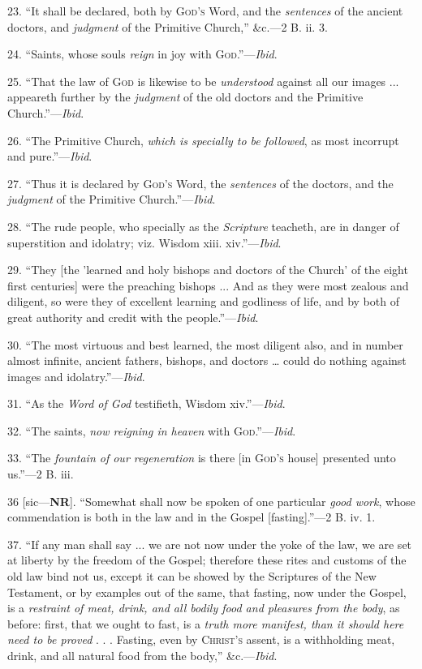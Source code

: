 23. ``It shall be declared, both by G\textsc{od's}
Word, and the \emph{sentences} of the ancient doctors, and \emph{judgment}
of the Primitive Church,'' \&c.—2 B. ii. 3.

24. ``Saints, whose souls \emph{reign} in joy with G\textsc{od}.''—\emph{Ibid}.

25. ``That the law of G\textsc{od} is likewise to
be \emph{understood} against all our images ... appeareth further by
the \emph{judgment} of the old doctors and the Primitive Church.''—\emph{Ibid}.

26. ``The Primitive Church, \emph{which is specially to be
followed}, as most incorrupt and pure.''—\emph{Ibid}.

27. ``Thus it is declared by G\textsc{od's} Word,
the \emph{sentences} of the doctors, and the \emph{judgment} of the
Primitive Church.''—\emph{Ibid}.

28. ``The rude people, who specially as the \emph{Scripture}
teacheth, are in danger of superstition and idolatry; viz. Wisdom
xiii. xiv.''—\emph{Ibid}.

29. ``They [the 'learned and holy bishops and doctors of the
Church' of the eight first centuries] were the preaching bishops ...
And as they were most zealous and diligent, so were they of excellent
learning and godliness of life, and by both of great authority and
credit with the people.''—\emph{Ibid}.

30. ``The most virtuous and best learned, the most diligent
also, and in number almost infinite, ancient fathers, bishops, and
doctors … could do nothing against images and idolatry.''—\emph{Ibid}.

31. ``As the \emph{Word of God} testifieth, Wisdom xiv.''—\emph{Ibid}.

32. ``The saints, \emph{now reigning in heaven} with G\textsc{od}.''—\emph{Ibid}.

33. ``The \emph{fountain of our regeneration} is there [in G\textsc{od's}
house] presented unto us.''—2 B. iii.

36 [sic—\textbf{NR}]. ``Somewhat
shall now be spoken of one particular \emph{good work}, whose
commendation is both in the law and in the Gospel [fasting].''—2
B. iv. 1.

37. ``If any man shall say ... we are not now under the yoke of
the law, we are set at liberty by the freedom of the Gospel; therefore
these rites and customs of the old law bind not us, except it can be
showed by the Scriptures of the New Testament, or by examples out of
the same, that fasting, now under the Gospel, is a \emph{restraint of
meat, drink, and all bodily food and pleasures from the body}, as
before: first, that we ought to fast, is a \emph{truth more manifest,
than it should here need to be proved} . . . Fasting, even by C\textsc{hrist's}
assent, is a withholding meat, drink, and all natural food from the
body,'' \&c.—\emph{Ibid}.


